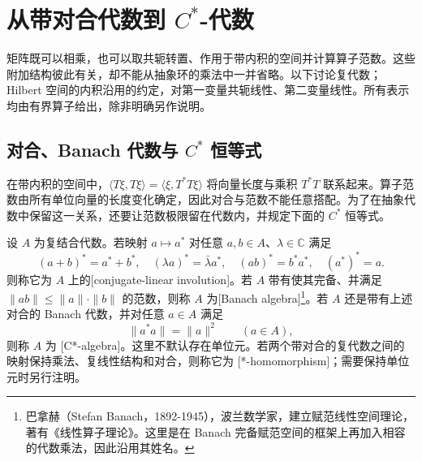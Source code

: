 

\section{从带对合代数到 \texorpdfstring{\(C^*\)}{C*}-代数}
\label{b2:sec:D01}

矩阵既可以相乘，也可以取共轭转置、作用于带内积的空间并计算算子范数。这些附加结构彼此有关，却不能从抽象环的乘法中一并省略。以下讨论复代数；Hilbert 空间的内积沿用的约定，对第一变量共轭线性、第二变量线性。所有表示均由有界算子给出，除非明确另作说明。

\subsection{对合、Banach 代数与 \texorpdfstring{\(C^*\)}{C*} 恒等式}
\label{b2:subsec:D01:01}

在带内积的空间中，\(\langle T\xi,T\xi\rangle=\langle\xi,T^*T\xi\rangle\) 将向量长度与乘积 \(T^*T\) 联系起来。算子范数由所有单位向量的长度变化确定，因此对合与范数不能任意搭配。为了在抽象代数中保留这一关系，还要让范数极限留在代数内，并规定下面的 \(C^*\) 恒等式。

\begin{definition}\label{b2:def:banach-star-cstar}
	设 \(A\) 为复结合代数。若映射 \(a\mapsto a^*\) 对任意 \(a,b\in A\)、\(\lambda\in\mathbb C\) 满足
	\[
		(a+b)^*=a^*+b^*,\quad (\lambda a)^*=\bar\lambda a^*,\quad (ab)^*=b^*a^*,\quad (a^*)^*=a.
	\]
	则称它为 \(A\) 上的[conjugate-linear involution]。若 \(A\) 带有使其完备、并满足 \(\|ab\|\le\|a\|\cdot\|b\|\) 的范数，则称 \(A\) 为[Banach algebra]\footnote{巴拿赫（Stefan Banach，1892-1945），波兰数学家，建立赋范线性空间理论，著有《线性算子理论》。这里是在 Banach 完备赋范空间的框架上再加入相容的代数乘法，因此沿用其姓名。}。若 \(A\) 还是带有上述对合的 Banach 代数，并对任意 \(a\in A\) 满足
	\begin{equation}\label{b2:eq:cstar-identity}
		\|a^*a\|=\|a\|^2\qquad(a\in A),
	\end{equation}
	则称 \(A\) 为 [C*-algebra]。这里不默认存在单位元。若两个带对合的复代数之间的映射保持乘法、复线性结构和对合，则称它为 [*-homomorphism]；需要保持单位元时另行注明。
\end{definition}

